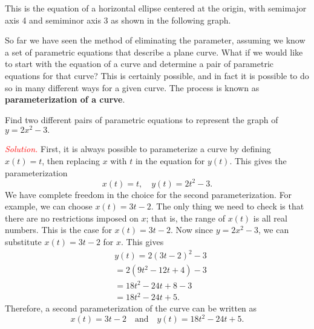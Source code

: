 \documentclass{report}
\begin{document}
    \pagebreak \bigbreak \noindent 
    \begin{minipage}[b]{0.47\textwidth}
        This is the equation of a horizontal ellipse centered at the origin, with semimajor axis 4 and semiminor axis 3 as shown in the following graph. 
    \end{minipage}
    \hspace{.1in}
    \begin{minipage}[]{0.47\textwidth}
    \end{minipage}
    \bigbreak \noindent 
    So far we have seen the method of eliminating the parameter, assuming we know a set of parametric equations that describe a plane curve. What if we would like to start with the equation of a curve and determine a pair of parametric equations for that curve? This is certainly possible, and in fact it is possible to do so in many different ways for a given curve. The process is known as \textbf{parameterization of a curve}.
    \bigbreak \noindent 
    \begin{exm}
        Find two different pairs of parametric equations to represent the graph of  $y=2x^{2}-3.$
    \end{exm}
    \bigbreak \noindent 
    \textcolor{red}{\textit{Solution.}}
    First, it is always possible to parameterize a curve by defining \( x(t) = t \), then replacing \( x \) with \( t \) in the equation for \( y(t) \). This gives the parameterization
    \[
        x(t) = t, \quad y(t) = 2t^2 - 3.
    \]
    \bigbreak \noindent 
    We have complete freedom in the choice for the second parameterization. For example, we can choose \( x(t) = 3t - 2 \). The only thing we need to check is that there are no restrictions imposed on \( x \); that is, the range of \( x(t) \) is all real numbers. This is the case for \( x(t) = 3t - 2 \). Now since \( y = 2x^2 - 3 \), we can substitute \( x(t) = 3t - 2 \) for \( x \). This gives
    \begin{align*}
        &y(t) = 2(3t - 2)^2 - 3 \\
        &= 2(9t^2 - 12t + 4) - 3 \\
        &= 18t^2 - 24t + 8 - 3 \\
        &= 18t^2 - 24t + 5
    .\end{align*}
    Therefore, a second parameterization of the curve can be written as
    \[
        x(t) = 3t - 2 \quad \text{and} \quad y(t) = 18t^2 - 24t + 5.
    \]

    \pagebreak 
\end{document}

